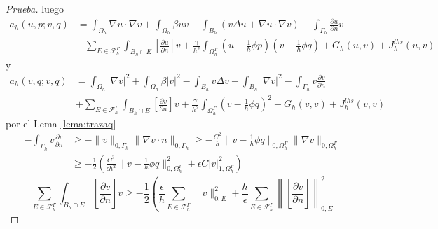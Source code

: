 \begin{proof}[Prueba]
	luego
	\[
	\begin{aligned}	
		a_h(u,p;v,q)&=\int_{\Omega_h} \nabla u\cdot \nabla v +\int_{\Omega_h} \beta uv - 
		\int_{B_h} (v \Delta u + \nabla u\cdot \nabla v) 
		-\int_{\Gamma_h} \frac{\partial u}{\partial n} v 
		\\
		&+ \sum_{E\in \mathcal{F}_h^\Gamma}\int_{B_h \cap E} \left[\frac{\partial u}{\partial n} 
		\right]v + \frac{\gamma}{h^2}\int_{\Omega^\Gamma_h} (u-\frac{1}{h}\phi p)(v-\frac{1}{h}\phi q) +G_h(u,v)+J_h^{lhs}(u,v)
	\end{aligned}
	\]
	y
	\[
	\begin{aligned}	
		a_h(v,q;v,q)&=\int_{\Omega_h} |\nabla v |^2 +\int_{\Omega_h} \beta |v |^2 - 
		\int_{B_h} v \Delta v -\int_{B_h} |\nabla v|^2
		-	\int_{\Gamma_h} v\frac{\partial v}{\partial n}  
		\\
		&+ \sum_{E\in \mathcal{F}_h^\Gamma}\int_{B_h \cap E} \left[\frac{\partial v}{\partial n} 
		\right]v+ \frac{\gamma}{h^2}\int_{\Omega^\Gamma_h} (v-\frac{1}{h}\phi q)^2	+G_h(v,v)+J_h^{lhs}(v,v)
	\end{aligned}
	\]
	por el Lema \ref{lema:trazaq}
	\[
	\begin{aligned}
		-\int_{\Gamma_h} v\frac{\partial v}{\partial n} & \geq - \|v\|_{0,\Gamma_h}\|\nabla v \cdot n\|_{0,\Gamma_h}
		\geq - \frac{C^2}{h}\|v-\frac{1}{h}\phi q\|_{0,\Omega^\Gamma_h}\|\nabla v \|_{0,\Omega^\Gamma_h}\\
		& \geq -\frac{1}{2}\left(
		\frac{C^3}{\epsilon h^2}\|v-\frac{1}{h}\phi q\|^2_{0,\Omega^\Gamma_h} + \epsilon C | v |^2_{1,\Omega^\Gamma_h}
		\right)
	\end{aligned}
	\]
	\[
	\sum_{E\in \mathcal{F}_h^\Gamma}\int_{B_h \cap E} \left[\frac{\partial v}{\partial n} 
	\right]v \geq 
	-\frac{1}{2} \left( \frac{\epsilon}{h} \sum_{E\in \mathcal{F}_h^\Gamma} \|v\|^2_{0,E} + \frac{h}{\epsilon }
	\sum_{E\in \mathcal{F}_h^\Gamma}\left \| \left[\frac{\partial v}{\partial n} 
	\right] \right \|^2_{0,E} 
\]
\end{proof}
